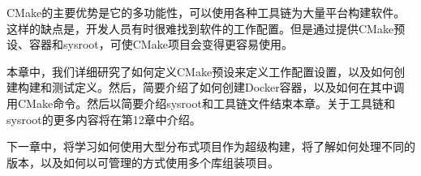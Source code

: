 CMake的主要优势是它的多功能性，可以使用各种工具链为大量平台构建软件。这样的缺点是，开发人员有时很难找到软件的工作配置。但是通过提供CMake预设、容器和sysroot，可使CMake项目会变得更容易使用。

本章中，我们详细研究了如何定义CMake预设来定义工作配置设置，以及如何创建构建和测试定义。然后，简要介绍了如何创建Docker容器，以及如何在其中调用CMake命令。然后以简要介绍sysroot和工具链文件结束本章。关于工具链和sysroot的更多内容将在第12章中介绍。

下一章中，将学习如何使用大型分布式项目作为超级构建，将了解如何处理不同的版本，以及如何以可管理的方式使用多个库组装项目。